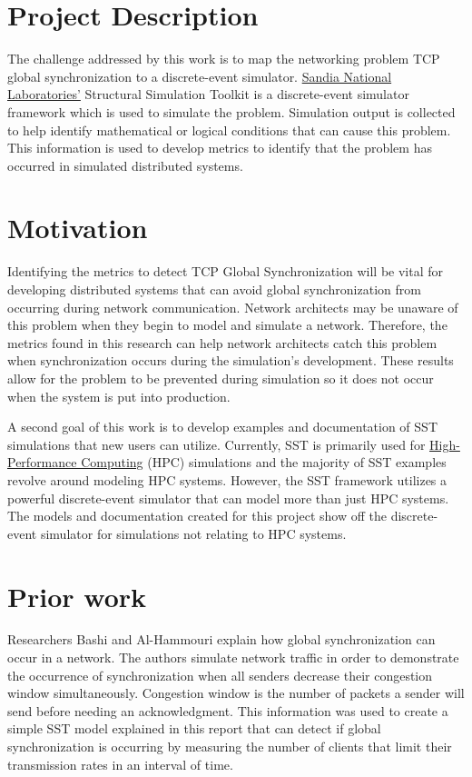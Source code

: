 \documentclass{article}
\begin{document}
\section{Project Description} %

The challenge addressed by this work is to map the networking problem TCP global synchronization to a discrete-event simulator. \href{https://www.sandia.gov/}{Sandia National Laboratories'} Structural Simulation Toolkit is a discrete-event simulator framework which is used to simulate the problem. Simulation output is collected to help identify mathematical or logical conditions that can cause this problem. This information is used to develop metrics to identify that the problem has occurred in simulated distributed systems. 

\section{Motivation} %

Identifying the metrics to detect TCP Global Synchronization will be vital for developing distributed systems that can avoid global synchronization from occurring during network communication. Network architects may be unaware of this problem when they begin to model and simulate a network. Therefore, the metrics found in this research can help network architects catch this problem when synchronization occurs during the simulation's development. These results allow for the problem to be prevented during simulation so it does not occur when the system is put into production.

A second goal of this work is to develop examples and documentation of SST simulations that new users can utilize. Currently, SST is primarily used for \href{https://en.wikipedia.org/wiki/High-performance_computing}{High-Performance Computing} (HPC) simulations and the majority of SST examples revolve around modeling HPC systems. However, the SST framework utilizes a powerful discrete-event simulator that can model more than just HPC systems. The models and documentation created for this project show off the discrete-event simulator for simulations not relating to HPC systems.

\section{Prior work} %
Researchers Bashi and Al-Hammouri \cite{Bashi2017} explain how global synchronization can occur in a network. The authors simulate network traffic in order to demonstrate the occurrence of  synchronization when all senders decrease their congestion window simultaneously. Congestion window is the number of packets a sender will send before needing an acknowledgment. This information was used to create a simple SST model explained in this report that can detect if global synchronization is occurring by measuring the number of clients that limit their transmission rates in an interval of time.
\end{document}
